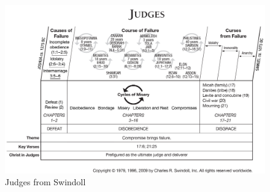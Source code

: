 

\newpage
\begin{figure}
\begin{center}
\includegraphics[scale=0.25, angle=90]{07OT-Judges/References/1.Judges-Swindoll}
\caption[Judges from Swindoll]{Judges from Swindoll}
\label{fig:Judges from Swindoll}
\end{center}
\end{figure}




